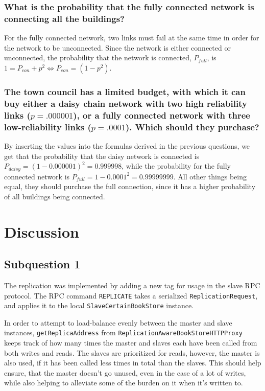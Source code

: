 \documentclass[11pt,a4paper]{article}
\begin{document}
\subsubsection*{What is the probability that the fully connected network is
                connecting all the buildings?}

For the fully connected network, two links must fail at the same time in order
for the network to be unconnected. Since the network is either connected or
unconnected, the probability that the network is connected, $P_{full}$, is $1 =
P_{con} + p^2 \Leftrightarrow P_{con} = (1-p^2)$.

\subsubsection*{The town council has a limited budget, with which it can buy
either a daisy chain network with two high reliability links ($p = .000001$),
or a fully connected network with three low-reliability links ($p = .0001$).
Which should they purchase?}

By inserting the values into the formulas derived in the previous questions,
we get that the probability that the daisy network is connected is $P_{daisy}
= (1-0.000001)^2 = 0.999998$, while the probability for the fully connected
network is $P_{full} = 1-0.0001^2 = 0.99999999$. All other things being equal,
they should purchase the full connection, since it has a higher probability of
all buildings being connected.

\section*{Discussion}

\subsection*{Subquestion 1}

The replication was implemented by adding a new tag for usage in the slave RPC
protocol. The RPC command \texttt{REPLICATE} takes a serialized \texttt{ReplicationRequest},
and applies it to the local \texttt{SlaveCertainBookStore} instance.

In order to attempt to load-balance evenly between the master and slave instances,
\texttt{getReplicaAddress} from \texttt{ReplicationAwareBookStoreHTTPProxy} keeps track
of how many times the master and slaves each have been called from both writes and reads.
The slaves are prioritized for reads, however, the master is also used, if it has been
called less times in total than the slaves. This should help ensure, that the master
doesn't go unused, even in the case of a lot of writes, while also helping to alleviate
some of the burden on it when it's written to.
\end{document}
